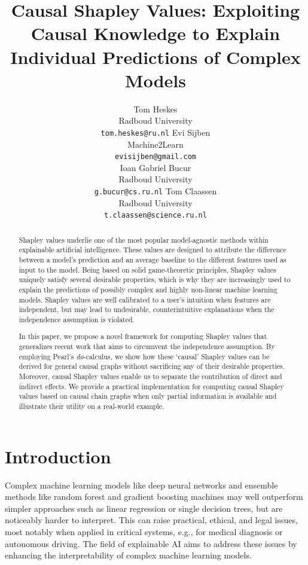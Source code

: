 \documentclass{article}
\title{Causal Shapley Values: Exploiting Causal Knowledge to Explain Individual Predictions of Complex Models}
\author{%
  Tom Heskes\\
  Radboud University \\
  \texttt{tom.heskes@ru.nl}
  \And
  Evi Sijben\\
  Machine2Learn\\
  \texttt{evisijben@gmail.com} \\
  \And
  Ioan Gabriel Bucur \\
  Radboud University \\
  \texttt{g.bucur@cs.ru.nl}
  \And
  Tom Claassen\\
  Radboud University \\
  \texttt{t.claassen@science.ru.nl}
}
\begin{document}
\maketitle

\begin{abstract}
Shapley values underlie one of the most popular model-agnostic methods within explainable artificial intelligence. These values are designed to attribute the difference between a model's prediction and an average baseline to the different features used as input to the model. Being based on solid game-theoretic principles, Shapley values uniquely satisfy several desirable properties, which is why they are increasingly used to explain the predictions of possibly complex and highly non-linear machine learning models. Shapley values are well calibrated to a user’s intuition when features are independent, but may lead to undesirable, counterintuitive explanations when the independence assumption is violated.

In this paper, we propose a novel framework for computing Shapley values that generalizes recent work that aims to circumvent the independence assumption. By employing Pearl's \textit{do}-calculus, we show how these `causal' Shapley values can be derived for general causal graphs without sacrificing any of their desirable properties. Moreover, causal Shapley values enable us to separate the contribution of direct and indirect effects. We provide a practical implementation for computing causal Shapley values based on causal chain graphs when only partial information is available and illustrate their utility on a real-world example.
\end{abstract}


\section{Introduction}
Complex machine learning models like deep neural networks and ensemble methods like random forest and gradient boosting machines may well outperform simpler approaches such as linear regression or single decision trees, but are noticeably harder to interpret. This can raise practical, ethical, and legal issues, most notably when applied in critical systems, e.g., for medical diagnosis or autonomous driving. The field of explainable AI aims to address these issues by enhancing the interpretability of complex machine learning models.
\end{document}
